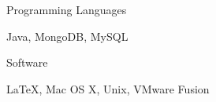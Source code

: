 \begin{cventries}
  \cventry
    {Programming Languages}
    {}
    { }
    { }
    {
      \begin{cvitems}
        \item {Java, MongoDB, MySQL}
      \end{cvitems}
    }
  \cventry
    {Software}
    { }
    { }
    { }
    {
      \begin{cvitems}
        \item {LaTeX, Mac OS X, Unix, VMware Fusion}
      \end{cvitems}
    }
\end{cventries}
